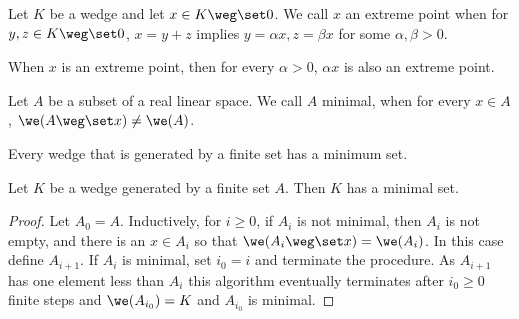 \documentclass[12pt,a4paper]{article}
\begin{document}
\begin{definition}
    Let $K$ be a wedge and let $x\in K\weg\set 0$. We call $x$ an extreme point when for $y,z\in K\weg\set 0$, $x=y+z$ implies $y=\alpha x, z=\beta x$ for some $\alpha,\beta>0$.  
\end{definition}
\begin{remark}
    When $x$ is an extreme point, then for every $\alpha>0$, $\alpha x $ is also an extreme point. 
\end{remark}

\begin{definition}
    Let $A$ be a subset of a real linear space. We call $A$ minimal, when for every $x\in A$, $\we(A\weg \set x)\neq \we(A)$. 
\end{definition}

Every wedge that is generated by a finite set has a minimum set. 
\begin{lemma}
  Let $K$ be a wedge generated by a finite set $A$. Then $K$ has a minimal set.
\end{lemma}
\begin{proof}
    Let $A_0=A$. Inductively, for $i\ge 0$, if $A_i$ is not minimal, then $A_i$ is not empty, and there is an $x\in A_i$ so that $\we(A_i\weg \set x)=\we(A_i)$. In this case define $A_{i+1}$. If $A_i$ is minimal, set $i_0=i$ and terminate the procedure.  As $A_{i+1}$ has one element less than $A_i$ this algorithm eventually terminates after $i_0\ge 0$ finite steps and $\we(A_{i_0})=K$ and $A_{i_0}$ is minimal. 
\end{proof}
\end{document}
